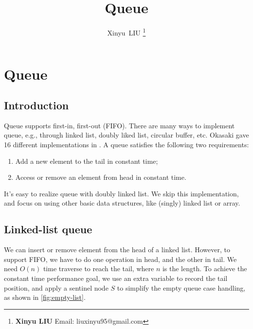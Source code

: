 \documentclass[b5paper]{article}
\begin{document}
\title{Queue}

\author{Xinyu~LIU
\thanks{{\bfseries Xinyu LIU} \newline
  Email: liuxinyu95@gmail.com \newline}
  }

\maketitle
\fi


\ifx\wholebook\relax
\chapter{Queue}
\fi

\section{Introduction}
\label{introduction}

Queue supports first-in, first-out (FIFO). There are many ways to implement queue, e.g., through linked list, doubly liked list, circular buffer, etc. Okasaki gave 16 different implementations in \cite{okasaki-book}. A queue satisfies the following two requirements:

\begin{enumerate}
\item Add a new element to the tail in constant time;
\item Access or remove an element from head in constant time.
\end{enumerate}

It's easy to realize queue with doubly linked list. We skip this implementation, and focus on using other basic data structures, like (singly) linked list or array.

\section{Linked-list queue}

We can insert or remove element from the head of a linked list. However, to support FIFO, we have to do one operation in head, and the other in tail. We need $O(n)$ time traverse to reach the tail, where $n$ is the length. To achieve the constant time performance goal, we use an extra variable to record the tail position, and apply a sentinel node $S$ to simplify the empty queue case handling, as shown in \cref{fig:empty-list}.
\end{document}
